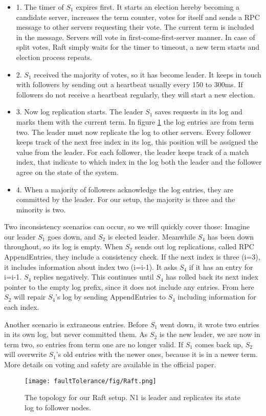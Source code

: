 \begin{itemize}
	\item 1. The timer of $S_1$ expires first. It starts an election hereby becoming a candidate server, increases the term counter, votes for itself and sends a RPC message to other servers requesting their vote. The current term is included in the message. Servers will vote in  first-come-first-server manner. In case of split votes, Raft simply waits for the timer to timeout, a new term starts and election process repeats.
	\item 2. $S_1$ received the majority of votes, so it has become leader. It keeps in touch with followers by sending out a heartbeat usually every 150 to 300ms. If followers do not receive a heartbeat regularly, they will start a new election.
	\item 3. Now log replication starts. The leader $S_1$ saves requests in its log and marks them with the current term. In figure \ref{fig:raft} the log entries are from term two. The leader must now replicate the log to other servers. Every follower keeps track of the next free index in its log, this position will be assigned the value from the leader. For each follower, the leader keeps track of a match index, that indicate to which index in the log both the leader and the follower agree on the state of the system.
	\item 4. When a majority of followers acknowledge the log entries, they are committed by the leader. For our setup, the majority is three and the minority is two.
\end{itemize}

\noindent Two inconsistency scenarios can occur, so we will quickly cover those: Imagine our leader $S_1$ goes down, and $S_2$ is elected leader. Meanwhile $S_4$ has been down throughout, so its log is empty. When $S_2$ sends out log replications, called RPC AppendEntries, they include a consistency check. If the next index is three (i=3), it includes information about index two (i=i-1). It asks $S_4$ if it has an entry for i=i-1. $S_4$ replies negatively. This continues until $S_4$ has rolled back its next index pointer to the empty log prefix, since it does not include any entries. From here $S_2$ will repair $S_4$'s log by sending AppendEntries to $S_4$ including information for each index.

\noindent Another scenario is extraneous entries. Before $S_1$ went down, it wrote two entries in its own log, but never committed them. As $S_2$ is the new leader, we are now in term two, so entries from term one are no longer valid. If $S_1$ comes back up, $S_2$ will overwrite $S_1$'s old entries with the newer ones, because it is in a newer term. More details on voting and safety are available in the official paper.

\begin{figure}[H]
	\centering
	\texttt{[image: faultTolerance/fig/Raft.png]}
	\caption{The topology for our Raft setup. N1 is leader and replicates its state log to follower nodes.}
	\label{fig:raft}
\end{figure}


